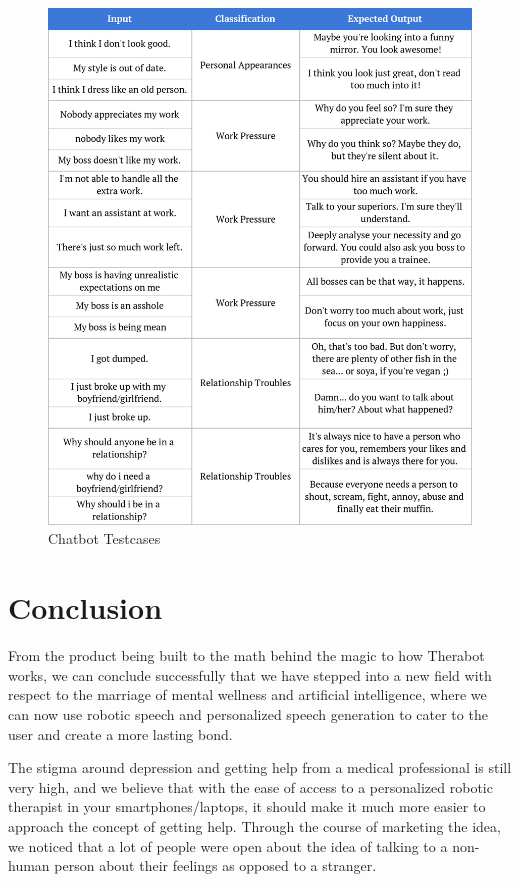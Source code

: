 \documentclass[conference,compsoc]{IEEEtran}
\begin{document}
\begin{figure}[H]
    \centering
    \includegraphics[width=\linewidth]{images/chatbot-testcases.jpg}
    \caption{Chatbot Testcases}
\end{figure}


\section{Conclusion}

From the product being built to the math behind the magic to how Therabot works, we can conclude successfully that we have stepped into a new field with respect to the marriage of mental wellness and artificial intelligence, where we can now use robotic speech and personalized speech generation to cater to the user and create a more lasting bond.

The stigma around depression and getting help from a medical professional is still very high, and we believe that with the ease of access to a personalized robotic therapist in your smartphones/laptops, it should make it much more easier to approach the concept of getting help. Through the course of marketing the idea, we noticed that a lot of people were open about the idea of talking to a non-human person about their feelings as opposed to a stranger.
\end{document}
